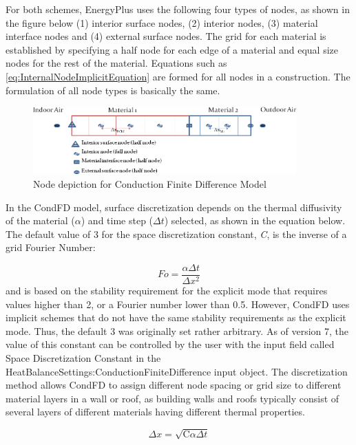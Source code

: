 For both schemes, EnergyPlus uses the following four types of nodes, as shown in
the figure below (1) interior surface nodes, (2) interior nodes, (3) material
interface nodes and (4) external surface nodes. The grid for each material is
established by specifying a half node for each edge of a material and equal size
nodes for the rest of the material. Equations such as
\ref{eq:InternalNodeImplicitEquation} are formed for all nodes in a
construction. The formulation of all node types is basically the same.

\begin{figure}[hbtp] %
\centering
\includegraphics[width=0.9\textwidth, height=0.9\textheight, keepaspectratio=true]{media/image176.png}
\caption{Node depiction for Conduction Finite Difference Model \protect \label{fig:node-depiction-for-conduction-finite}}
\end{figure}

In the CondFD model, surface discretization depends on the thermal diffusivity
of the material ($\alpha$) and time step ($\Delta t$) selected, as shown in the
equation below. The default value of 3 for the space discretization constant,
\emph{C}, is the inverse of a grid Fourier Number:

\begin{equation}
Fo = \frac{\alpha \Delta t}{\Delta x^2}
\end{equation}
%
and is based on the stability requirement for the explicit mode that requires
values higher than 2, or a Fourier number lower than 0.5. However, CondFD uses
implicit schemes that do not have the same stability requirements as the
explicit mode. Thus, the default 3 was originally set rather arbitrary. As of
version 7, the value of this constant can be controlled by the user with the
input field called Space Discretization Constant in the
HeatBalanceSettings:ConductionFiniteDifference input object. The discretization
method allows CondFD to assign different node spacing or grid size to different
material layers in a wall or roof, as building walls and roofs typically consist
of several layers of different materials having different thermal properties.

\begin{equation}
\Delta x = \sqrt {\text{C}\alpha \Delta t}
\end{equation}


